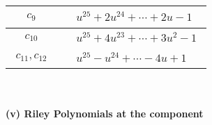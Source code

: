 \documentclass[1p]{elsarticle_modified}
\theoremstyle{definition}
\begin{document}
\begin{tabular}{m{50pt}|m{274pt}}
\hline $$\begin{aligned}c_{9}\end{aligned}$$&$\begin{aligned}
&u^{25}+2 u^{24}+\cdots+2 u-1
\end{aligned}$\\
\hline $$\begin{aligned}c_{10}\end{aligned}$$&$\begin{aligned}
&u^{25}+4 u^{23}+\cdots+3 u^2-1
\end{aligned}$\\
\hline $$\begin{aligned}c_{11},c_{12}\end{aligned}$$&$\begin{aligned}
&u^{25}- u^{24}+\cdots-4 u+1
\end{aligned}$\\
\hline
\end{tabular}\\~\\
\newpage\renewcommand{\arraystretch}{1}
\flushleft \textbf{(v) Riley Polynomials at the component}\newline \\
\end{document}
